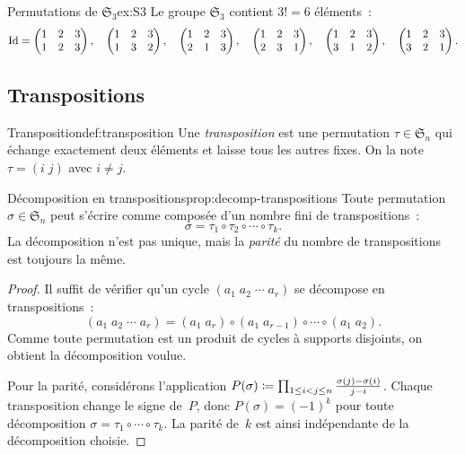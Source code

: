 \begin{example}{Permutations de $\mathfrak{S}_3$}{ex:S3}
  Le groupe $\mathfrak{S}_3$ contient $3!=6$ éléments~:
  \[
    \operatorname{Id}=\begin{pmatrix}1&2&3\\1&2&3\end{pmatrix},\quad
    \begin{pmatrix}1&2&3\\1&3&2\end{pmatrix},\quad
    \begin{pmatrix}1&2&3\\2&1&3\end{pmatrix},\quad
    \begin{pmatrix}1&2&3\\2&3&1\end{pmatrix},\quad
    \begin{pmatrix}1&2&3\\3&1&2\end{pmatrix},\quad
    \begin{pmatrix}1&2&3\\3&2&1\end{pmatrix}.
  \]
\end{example}

\subsection{Transpositions}\label{subsec:transpositions}

\begin{definition}{Transposition}{def:transposition}
  Une \emph{transposition} est une permutation
  $\tau\in\mathfrak{S}_n$ qui échange exactement deux éléments et laisse
  tous les autres fixes. On la note $\tau=(i\;j)$ avec $i\neq j$.
\end{definition}

\begin{proposition}{Décomposition en transpositions}{prop:decomp-transpositions}
  Toute permutation $\sigma\in\mathfrak{S}_n$ peut s'écrire comme
  composée d'un nombre fini de transpositions~:
  \[
    \sigma=\tau_1\circ\tau_2\circ\cdots\circ\tau_k.
  \]
  La décomposition n'est pas unique, mais la \emph{parité} du nombre de
  transpositions est toujours la même.
\end{proposition}

\begin{proof}
  Il suffit de vérifier qu'un cycle $(a_1\;a_2\;\cdots\;a_r)$ se
  décompose en transpositions~:
  \[
    (a_1\;a_2\;\cdots\;a_r)=(a_1\;a_r)\circ(a_1\;a_{r-1})\circ
    \cdots\circ(a_1\;a_2).
  \]
  Comme toute permutation est un produit de cycles à supports disjoints,
  on obtient la décomposition voulue.

  Pour la parité, considérons l'application
  $P(\sigma)\coloneqq\prod_{1\leq i<j\leq n}\frac{\sigma(j)-\sigma(i)}{j-i}$.
  Chaque transposition change le signe de~$P$, donc $P(\sigma)=(-1)^k$
  pour toute décomposition $\sigma=\tau_1\circ\cdots\circ\tau_k$. La
  parité de~$k$ est ainsi indépendante de la décomposition choisie.
\end{proof}

